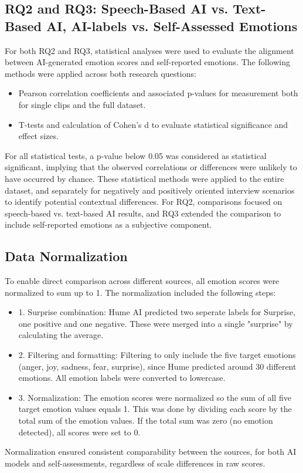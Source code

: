 \subsection{RQ2 and RQ3: Speech-Based AI vs. Text-Based AI, AI-labels vs. Self-Assessed Emotions}
For both RQ2 and RQ3, statistical analyses were used to evaluate the alignment between AI-generated emotion scores and self-reported emotions. The following methods were applied across both research questions:
\begin{itemize}
    \item Pearson correlation coefficients and associated p-values for measurement both for single clips and the full dataset. 
    \item T-tests and calculation of Cohen's d to evaluate statistical significance and effect sizes. 
\end{itemize}
For all statistical tests, a p-value below 0.05 was considered as statistical significant, implying that the observed correlations or differences were unlikely to have occurred by chance. 
These statistical methods were applied to the entire dataset, and separately for negatively and positively oriented interview scenarios to identify potential contextual differences.
For RQ2, comparisons focused on speech-based vs. text-based AI results, and RQ3 extended the comparison to include self-reported emotions as a subjective component.

\subsection{Data Normalization}
To enable direct comparison across different sources, all emotion scores were normalized to sum up to 1. The normalization included the following steps: 
\begin{itemize}
    \item 1. Surprise combination: Hume AI predicted two seperate labels for Surprise, one positive and one negative. These were merged into a single "surprise" by calculating the average. 
    \item 2. Filtering and formatting: Filtering to only include the five target emotions (anger, joy, sadness, fear, surprise), since Hume predicted around 30 different emotions. All emotion labels were converted to lowercase. 
    \item 3. Normalization: The emotion scores were normalized so the sum of all five target emotion values equals 1. This was done by dividing each score by the total sum of the emotion values. If the total sum was zero (no emotion detected), all scores were set to 0. 
\end{itemize}
Normalization ensured consistent comparability between the sources, for both AI models and self-assessments, regardless of scale differences in raw scores. 
